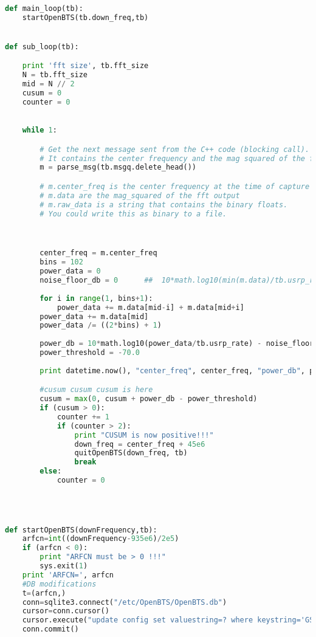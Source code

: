 \begin{lstlisting}[language=Python]

def main_loop(tb):
    startOpenBTS(tb.down_freq,tb)


def sub_loop(tb):

    print 'fft size', tb.fft_size
    N = tb.fft_size
    mid = N // 2
    cusum = 0
    counter = 0
    

    while 1:

        # Get the next message sent from the C++ code (blocking call).
        # It contains the center frequency and the mag squared of the fft
        m = parse_msg(tb.msgq.delete_head())

        # m.center_freq is the center frequency at the time of capture
        # m.data are the mag_squared of the fft output
        # m.raw_data is a string that contains the binary floats.
        # You could write this as binary to a file.



        center_freq = m.center_freq
        bins = 102
        power_data = 0
        noise_floor_db = 0      ##  10*math.log10(min(m.data)/tb.usrp_rate)
        
        for i in range(1, bins+1):
            power_data += m.data[mid-i] + m.data[mid+i]
        power_data += m.data[mid]
        power_data /= ((2*bins) + 1)
        
        power_db = 10*math.log10(power_data/tb.usrp_rate) - noise_floor_db
        power_threshold = -70.0
        
        print datetime.now(), "center_freq", center_freq, "power_db", power_db

        #cusum cusum cusum is here
        cusum = max(0, cusum + power_db - power_threshold)
        if (cusum > 0):
            counter += 1
            if (counter > 2):
                print "CUSUM is now positive!!!"
                down_freq = center_freq + 45e6
                quitOpenBTS(down_freq, tb)
                break
        else:
            counter = 0




def startOpenBTS(downFrequency,tb):
    arfcn=int((downFrequency-935e6)/2e5)
    if (arfcn < 0):
        print "ARFCN must be > 0 !!!"
        sys.exit(1)
    print 'ARFCN=', arfcn
    #DB modifications
    t=(arfcn,)
    conn=sqlite3.connect("/etc/OpenBTS/OpenBTS.db")
    cursor=conn.cursor()
    cursor.execute("update config set valuestring=? where keystring='GSM.Radio.C0'",t)
    conn.commit()


\end{lstlisting}
